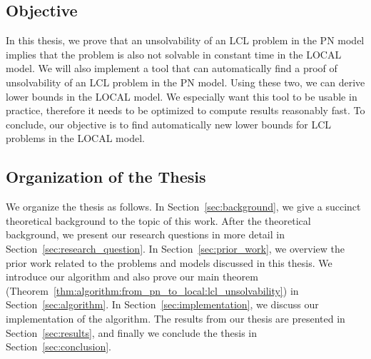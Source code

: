 \subsection{Objective}
In this thesis, we prove that an unsolvability of an LCL problem in the PN model implies that the problem is also not solvable in constant time in the LOCAL model.
We will also implement a tool that can automatically find a proof of unsolvability of an LCL problem in the PN model.
Using these two, we can derive lower bounds in the LOCAL model.
We especially want this tool to be usable in practice, therefore it needs to be optimized to compute results reasonably fast.
To conclude, our objective is to find automatically new lower bounds for LCL problems in the LOCAL model.

\subsection{Organization of the Thesis}
We organize the thesis as follows.
In Section~\ref{sec:background}, we give a succinct theoretical background to the topic of this work.
After the theoretical background, we present our research questions in more detail in Section~\ref{sec:research_question}.
In Section~\ref{sec:prior_work}, we overview the prior work related to the problems and models discussed in this thesis.
We introduce our algorithm and also prove our main theorem (Theorem~\ref{thm:algorithm:from_pn_to_local:lcl_unsolvability}) in Section~\ref{sec:algorithm}.
In Section~\ref{sec:implementation}, we discuss our implementation of the algorithm.
The results from our thesis are presented in Section~\ref{sec:results}, and finally we conclude the thesis in Section~\ref{sec:conclusion}.
